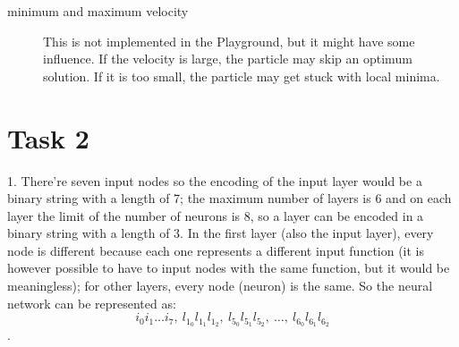 \documentclass[12pt]{article}
\begin{document}
\begin{description}
\item[minimum and maximum velocity]
This is not implemented in the Playground, but it might have some influence. If the velocity is large, the particle may skip an optimum solution. If it is too small, the particle may get stuck with local minima.
\end{description}

\section{Task 2}
1. There're seven input nodes so the encoding of the input layer would be a binary string with a length of 7; the maximum number of layers is 6 and on each layer the limit of the number of neurons is 8, so a layer can be encoded in a binary string with a length of 3. In the first layer (also the input layer), every node is different because each one represents a different input function (it is however possible to have to input nodes with the same function, but it would be meaningless); for other layers, every node (neuron) is the same. So the neural network can be represented as:
$$
{i_0i_1\ldots i_7,\ l_{1_0}l_{1_1}l_{1_2},\ l_{5_0}l_{5_1}l_{5_2},\ \ldots,\ l_{6_0}l_{6_1}l_{6_2}}
$$
. 
\end{document}
